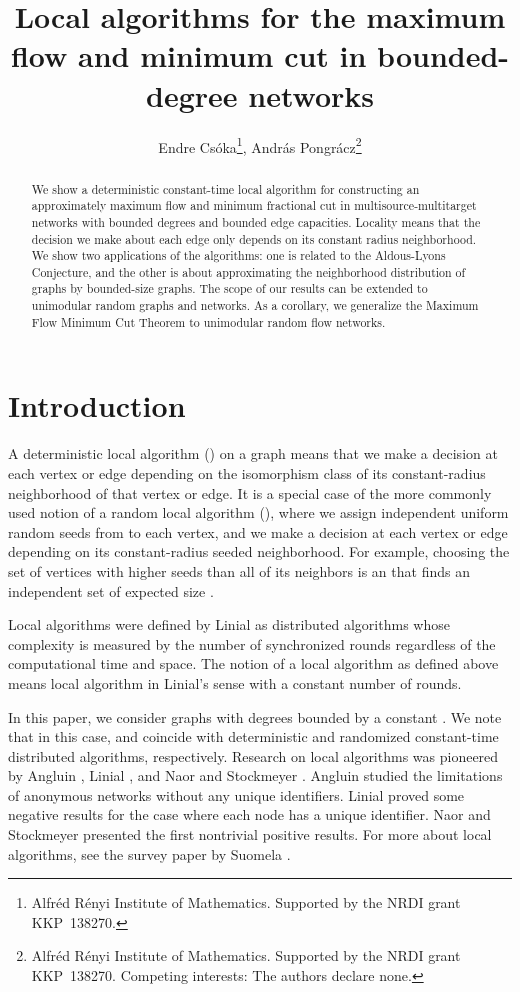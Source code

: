 \documentclass[12pt,a4paper]{article}
\title{Local algorithms for the maximum flow and minimum cut in bounded-degree networks}
\author{Endre Cs\'oka\thanks{Alfr\'ed R\'enyi Institute of Mathematics. Supported by the NRDI grant KKP~138270.}, Andr\'as Pongr\'acz\thanks{Alfr\'ed R\'enyi Institute of Mathematics. Supported by the NRDI grant KKP~138270. \newline
Competing interests: The authors declare none.}}
\date{}
\renewcommand{\:}{\colon}
\begin{document}
\maketitle

\begin{abstract}

We show a deterministic constant-time local algorithm for constructing an approximately maximum flow and minimum fractional cut in multisource-multitarget networks with bounded degrees and bounded edge capacities. 
Locality means that the decision we make about each edge only depends on its constant radius neighborhood. 
We show two applications of the algorithms: one is related to the Aldous-Lyons Conjecture, and the other is about approximating the neighborhood distribution of graphs by bounded-size graphs. 
The scope of our results can be extended to unimodular random graphs and networks. 
As a corollary, we generalize the Maximum Flow Minimum Cut Theorem to unimodular random flow networks. 

\end{abstract}

\section{Introduction}

A deterministic local algorithm () on a graph means that we make a decision at each vertex or edge depending on the isomorphism class of its constant-radius neighborhood of that vertex or edge. 
It is a special case of the more commonly used notion of a random local algorithm (), where we assign independent uniform random seeds from  to each vertex, and we make a decision at each vertex or edge depending on its constant-radius seeded neighborhood. 
For example, choosing the set of vertices with higher seeds than all of its neighbors is an  that finds an independent set of expected size . 

Local algorithms were defined by Linial \cite{Linial} as distributed algorithms whose complexity is measured by the number of synchronized rounds regardless of the computational time and space. 
The notion of a local algorithm as defined above means local algorithm in Linial's sense with a constant number of rounds. 

In this paper, we consider graphs with degrees bounded by a constant . 
We note that in this case,  and  coincide with deterministic and randomized constant-time distributed algorithms, respectively. 
Research on local algorithms was pioneered by Angluin \cite{Angluin}, Linial \cite{Linial}, and Naor and Stockmeyer \cite{NaSt}. 
Angluin \cite{Angluin} studied the limitations of anonymous networks without any unique identifiers. 
Linial \cite{Linial} proved some negative results for the case where each node has a unique identifier. 
Naor and Stockmeyer \cite{NaSt} presented the first nontrivial positive results. 
For more about local algorithms, see the survey paper by Suomela \cite{Suomela}.
\end{document}
